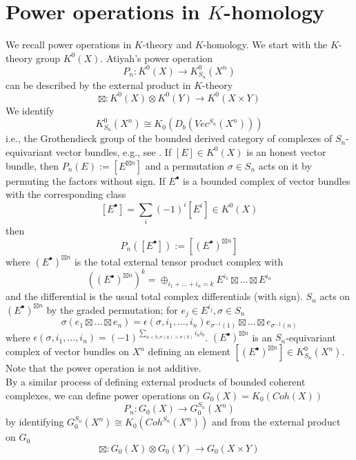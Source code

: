 \documentclass[11pt,leqno,twoside]{amsart}
\theoremstyle{plainsl}
\theoremstyle{definition}
\begin{document}
\section{Power operations in $K$-homology}\label{poweropsection}


We recall power operations in $K$-theory and $K$-homology. We start with the $K$-theory group $K^0(X)$.  Atiyah's power operation \cite{At}
\[P_n:K^0(X)\rightarrow K_{S_n}^0(X^n)\]
can be described by the external product in $K$-theory
\[\boxtimes : K^0(X)\otimes K^{0}(Y)\rightarrow K^0{(X\times Y)} \]
We identify $$K^0_{S_n}(X^n)\cong K_0(D_b(Vec^{S_n}(X^n)))$$ i.e., the Grothendieck group of the bounded derived category of complexes of $S_n$-equivariant vector bundles, e.g., see \cite[\S6]{CMSS}. If $[E]\in K^0(X)$ is an honest vector bundle, then $P_n(E):=[E^{\boxtimes n}]$ and
a permutation $\sigma\in S_n$ acts on it by permuting the factors without sign. If    $E^{\bullet}$ is a bounded  complex of vector bundles with the corresponding class $$[E^{\bullet}]=\sum_i (-1)^i[E^i]\in K^{0}(X)$$ then
\[P_n([E^{\bullet}]):=[(E^{\bullet})^{\boxtimes n}]\]
where $(E^{\bullet})^{\boxtimes n}$ is the total external tensor product complex with
\[((E^{\bullet})^{\boxtimes n})^k=\oplus_{i_1+\ldots+i_n=k} E^{i_1}\boxtimes \ldots \boxtimes E^{i_n}\]
and the differential is the usual total complex differentials (with sign). $S_n$ acts on $(E^{\bullet})^{\boxtimes n}$ by the graded permutation; for $e_j\in E^{i_j}, \sigma\in S_n$
\[\sigma(e_1\boxtimes\ldots \boxtimes e_n)=\epsilon(\sigma,i_1,\ldots,i_n)e_{\sigma^{-1}(1)}\boxtimes \ldots \boxtimes e_{\sigma^{-1}(n)}\]
where $\epsilon(\sigma,i_1,\ldots,i_n)=(-1)^{\sum_{a<b,\sigma(a)>\sigma(b)}i_ai_b}$.  $(E^{\bullet})^{\boxtimes n}$ is an $S_n$-equivariant complex of vector bundles on $X^n$ defining an element $[(E^{\bullet})^{\boxtimes n}]\in K_{S_n}^0(X^n)$. Note that the power operation is not additive.\\

By a similar process of defining external products of bounded coherent complexes, we can define power operations on $G_0(X)=K_0(Coh(X))$  
\begin{equation}\label{powerop_G0}
    P_n:G_0(X)\rightarrow G^{S_n}_0(X^n)
\end{equation}
by identifying $G^{S_n}_0(X^n)\cong K_0(Coh^{S_n}(X^n))$ and from the external product on $G_0$ \cite[\S3.1]{BFM2}
\[\boxtimes: G_0(X)\otimes G_0(Y)\rightarrow G_0(X\times Y)\]
\end{document}
